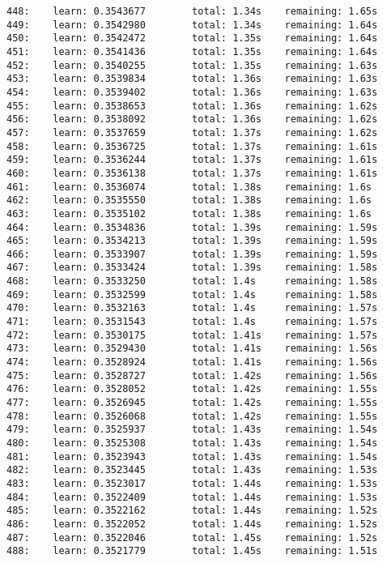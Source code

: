 \documentclass[11pt]{article}
\begin{document}
\begin{Verbatim}[commandchars=\\\{\}]
448:    learn: 0.3543677        total: 1.34s    remaining: 1.65s
449:    learn: 0.3542980        total: 1.34s    remaining: 1.64s
450:    learn: 0.3542472        total: 1.35s    remaining: 1.64s
451:    learn: 0.3541436        total: 1.35s    remaining: 1.64s
452:    learn: 0.3540255        total: 1.35s    remaining: 1.63s
453:    learn: 0.3539834        total: 1.36s    remaining: 1.63s
454:    learn: 0.3539402        total: 1.36s    remaining: 1.63s
455:    learn: 0.3538653        total: 1.36s    remaining: 1.62s
456:    learn: 0.3538092        total: 1.36s    remaining: 1.62s
457:    learn: 0.3537659        total: 1.37s    remaining: 1.62s
458:    learn: 0.3536725        total: 1.37s    remaining: 1.61s
459:    learn: 0.3536244        total: 1.37s    remaining: 1.61s
460:    learn: 0.3536138        total: 1.37s    remaining: 1.61s
461:    learn: 0.3536074        total: 1.38s    remaining: 1.6s
462:    learn: 0.3535550        total: 1.38s    remaining: 1.6s
463:    learn: 0.3535102        total: 1.38s    remaining: 1.6s
464:    learn: 0.3534836        total: 1.39s    remaining: 1.59s
465:    learn: 0.3534213        total: 1.39s    remaining: 1.59s
466:    learn: 0.3533907        total: 1.39s    remaining: 1.59s
467:    learn: 0.3533424        total: 1.39s    remaining: 1.58s
468:    learn: 0.3533250        total: 1.4s     remaining: 1.58s
469:    learn: 0.3532599        total: 1.4s     remaining: 1.58s
470:    learn: 0.3532163        total: 1.4s     remaining: 1.57s
471:    learn: 0.3531543        total: 1.4s     remaining: 1.57s
472:    learn: 0.3530175        total: 1.41s    remaining: 1.57s
473:    learn: 0.3529430        total: 1.41s    remaining: 1.56s
474:    learn: 0.3528924        total: 1.41s    remaining: 1.56s
475:    learn: 0.3528727        total: 1.42s    remaining: 1.56s
476:    learn: 0.3528052        total: 1.42s    remaining: 1.55s
477:    learn: 0.3526945        total: 1.42s    remaining: 1.55s
478:    learn: 0.3526068        total: 1.42s    remaining: 1.55s
479:    learn: 0.3525937        total: 1.43s    remaining: 1.54s
480:    learn: 0.3525308        total: 1.43s    remaining: 1.54s
481:    learn: 0.3523943        total: 1.43s    remaining: 1.54s
482:    learn: 0.3523445        total: 1.43s    remaining: 1.53s
483:    learn: 0.3523017        total: 1.44s    remaining: 1.53s
484:    learn: 0.3522409        total: 1.44s    remaining: 1.53s
485:    learn: 0.3522162        total: 1.44s    remaining: 1.52s
486:    learn: 0.3522052        total: 1.44s    remaining: 1.52s
487:    learn: 0.3522046        total: 1.45s    remaining: 1.52s
488:    learn: 0.3521779        total: 1.45s    remaining: 1.51s

\end{Verbatim}
\end{document}
